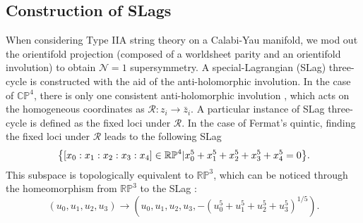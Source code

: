 \subsection{Construction of SLags}
When considering Type IIA string theory on a Calabi-Yau manifold, we mod out the orientifold 
projection (composed of a worldsheet parity and an orientifold involution) to obtain $\mathcal N=1$ supersymmetry.
A special-Lagrangian (SLag) three-cycle is constructed with the aid of the anti-holomorphic involution.
In the case of $\mathbb{CP}^4$, there is only one consistent anti-holomorphic involution \cite{Partouche2001},
which acts on the homogeneous coordinates as $\mathcal R: z_i \to\bar z_i$.
A particular instance of SLag three-cycle is defined as the fixed loci under $\mathcal R$.
In the case of Fermat's quintic, finding the fixed loci under $\mathcal R$ leads to the following SLag
\begin{equation}
  \qty{\qty[x_0:x_1:x_2:x_3:x_4]\in  \mathbb{RP}^4| x_0^5+x_1^5+x_2^5+x_3^5+x_4^5=0}.
\end{equation}
This subspace is topologically equivalent to $\mathbb{RP}^3$, which can be noticed through the
homeomorphism from $\mathbb{RP}^3$ to the SLag \cite{McLean1996}:
\begin{equation}
(u_0,u_1,u_2,u_3) \to (u_0,u_1,u_2,u_3, -(u_0^5+u_1^5+u_2^5+u_3^5)^{1/5}).
\end{equation}

